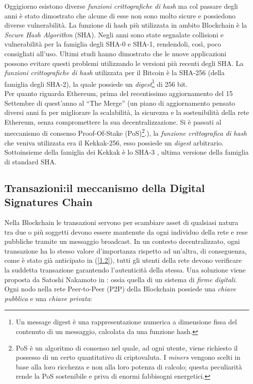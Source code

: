 Oggigiorno esistono diverse \textit{funzioni crittografiche di hash} ma col passare degli anni è stato dimostrato che alcune di esse non sono molto sicure e possiedono diverse vulnerabilità.
La funzione di hash più utilizzata in ambito Blockchain è la \textit{Secure Hash Algorithm} (SHA). Negli anni sono state segnalate collisioni e vulnerabilità per la famiglia degli SHA-0 e SHA-1, rendendoli, così, poco consigliati all'uso.
Ultimi studi hanno dimostrato che le nuove applicazioni possono evitare questi problemi utilizzando le versioni più recenti degli SHA.
La \textit{funzioni crittografiche di hash} utilizzata per il Bitcoin è la SHA-256 (della famiglia degli SHA-2), la quale possiede un \textit{digest}\footnote{Un message digest è una rappresentazione numerica a dimensione fissa del contenuto di un messaggio, calcolata da una funzione hash.} di 256 bit.\\
Per quanto riguarda Ethereum, prima del recentissimo aggiornamento del 15 Settembre di quest'anno al “The Merge”\cite{TheMerge} (un piano di aggiornamento pensato diversi anni fa per migliorare la scalabilità, la sicurezza e la sostenibilità della rete Ethereum, senza compromettere la sua decentralizzazione. Si è passati al meccanismo di consenso Proof-Of-Stake (PoS)\footnote{PoS è un algoritmo di consenso nel quale, ad ogni utente, viene richiesto il possesso di un certo quantitativo di criptovaluta. I \textit{miners} vengono scelti in base alla loro ricchezza e non alla loro potenza di calcolo; questa peculiarità rende la PoS sostenibile e priva di enormi fabbisogni energetici.}.), la \textit{funzione crittografica di hash}  che veniva utilizzata era il Kekkak-256, esso possiede un \textit{digest} arbitrario. Sottoinsieme della famiglia dei Kekkak è lo SHA-3 , ultima versione della famiglia di standard SHA. 
\subsection{Transazioni:il meccanismo della Digital Signatures Chain} \label{transazioni}

Nella Blockchain le transazioni servono per scambiare asset di qualsiasi natura tra due o più soggetti devono essere mantenute da ogni individuo della rete e rese pubbliche tramite un messaggio broadcast.
In un contesto decentralizzato, ogni transazione ha lo stesso valore d'importanza rispetto ad un'altra, di conseguenza, come è stato già anticipato in (\ref{1.2}), tutti gli utenti della rete devono verificare la suddetta transazione garantendo l'autenticità della stessa.
Una soluzione viene proposta da Satoshi Nakamoto in \cite{bitcoin}: ossia quella di un sistema di \textit{firme digitali}.
Ogni nodo nella rete Peer-to-Peer (P2P) della Blockchain possiede una \textit{chiave pubblica} e una \textit{chiave privata}:

